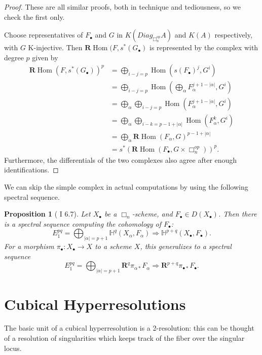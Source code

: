\documentclass{report}
\newtheorem{prop}[theorem]{Proposition}
\theoremstyle{definition}
\DeclareMathOperator{\Hom}{Hom}
\newcommand{\HH}{\mathbb{H}}
\newcommand{\bR}{\textbf{R}}
\begin{document}
\begin{proof}
	These are all similar proofs, both in technique and tediousness, so we check the first only.
	
	Choose representatives of $F_\bullet$ and $G$ in $K(Diag_{\Box_n^{op}} A)$ and $K(A)$ respectively, with $G$ K-injective.
	Then $\bR \Hom(F, s^* (G_\bullet)$ is represented by the complex with degree $p$ given by
	\begin{align*}
		\bR \Hom(F, s^* (G_\bullet))^p &= \bigoplus_{i-j = p} \Hom(s(F_\bullet)^j, G^i) \\
		&= \bigoplus_{i-j = p} \Hom(\bigoplus_\alpha F_\alpha^{j + 1 - |\alpha|}, G^i) \\
		&= \bigoplus_\alpha \bigoplus_{i-j = p} \Hom(F_\alpha^{j + 1 - |\alpha|}, G^i) \\
		&= \bigoplus_\alpha \bigoplus_{i-k = p - 1 + |\alpha|} \Hom(F_\alpha^k, G^i) \\
		&= \bigoplus_\alpha \bR \Hom(F_\alpha, G)^{p-1+|\alpha|} \\
		&= s^* (\bR \Hom(F_\bullet, G \times \Box_n^{op}))^p.
	\end{align*}
	Furthermore, the differentials of the two complexes also agree after enough identifications.
\end{proof}

We can skip the simple complex in actual computations by using the following spectral sequence.

\begin{prop}[\cite{Guillen1988} I 6.7]
	\label{prp:cubicalcohospecseq}
	Let $X_\bullet$ be a $\Box_n$-scheme, and $F_\bullet \in D(X_\bullet)$.
	Then there is a spectral sequence computing the cohomology of $F_\bullet$:
	\[
	E_1^{pq} = \bigoplus_{|\alpha| = p + 1} \HH^q(X_\alpha, F_\alpha) \Rightarrow \HH^{p+q}(X_\bullet, F_\bullet).
	\]
	For a morphism $\pi_\bullet : X_\bullet \rightarrow X$ to a scheme $X$, this generalizes to a spectral sequence
	\[
	E_1^{pq} = \bigoplus_{|\alpha| = p + 1} \bR^q \pi_{\alpha *}F_\alpha \Rightarrow \bR^{p+q} \pi_{\bullet *} F_\bullet.
	\]
\end{prop}

\section{Cubical Hyperresolutions}

The basic unit of a cubical hyperresolution is a 2-resolution: this can be thought of a resolution of singularities which keeps track of the fiber over the singular locus.
\end{document}

